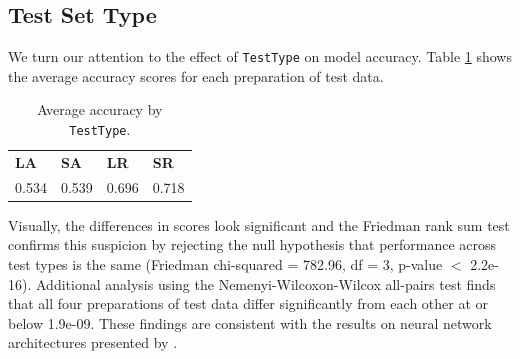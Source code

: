 \documentclass[twoside,11pt]{article}
\newcommand{\ttt}[1]{\texttt{#1}}
\newcommand{\tttx}[1]{\ttt{#1}\xspace}
\newcommand{\TestType}{\tttx{TestType}}
\begin{document}
\subsection{Test Set Type}
We turn our attention to the effect of \TestType on model accuracy. Table \ref{tab:test-type-avg} shows the average accuracy scores for each preparation of test data.

\begin{table}[ht]
  \centering
  \begin{tabular}{llll}
    \toprule
    \textbf{LA} & \textbf{SA} & \textbf{LR} & \textbf{SR} \\
    0.534       & 0.539       & 0.696       & 0.718       \\
    \bottomrule
  \end{tabular}
  \caption{Average accuracy by \ttt{TestType}.}
  \label{tab:test-type-avg}
\end{table}

Visually, the differences in scores look significant and the Friedman rank sum test confirms this suspicion by rejecting the null hypothesis that performance across test types is the same (Friedman chi-squared = 782.96, df = 3, p-value $<$ 2.2e-16). 
Additional analysis using the Nemenyi-Wilcoxon-Wilcox all-pairs test finds that all four preparations of test data differ significantly from each other at or below 1.9e-09.
These findings are consistent with the results on neural network architectures presented by \citet{heinz-etal-2022-mlregtest}.

\end{document}
